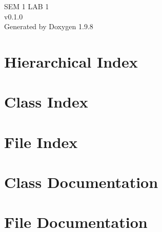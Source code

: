 \documentclass[twoside]{book}
\newcommand{\+}{\discretionary{\mbox{\scriptsize$\hookleftarrow$}}{}{}}
\newcommand{\clearemptydoublepage}{%
    \newpage{\pagestyle{empty}\cleardoublepage}%
  }
\begin{document}
  \raggedbottom
    \hypersetup{pageanchor=false,
                bookmarksnumbered=true,
                pdfencoding=unicode
               }
  \begin{titlepage}
  \vspace*{7cm}
  \begin{center}%
  {\Large SEM 1 LAB 1}\\
  [1ex]\large v0.\+1.\+0 \\
  \vspace*{1cm}
  {\large Generated by Doxygen 1.9.8}\\
  \end{center}
  \end{titlepage}
  \clearemptydoublepage
  \tableofcontents
  \clearemptydoublepage
  \hypersetup{pageanchor=true}


\chapter{Hierarchical Index}

\chapter{Class Index}

\chapter{File Index}

\chapter{Class Documentation}
















\chapter{File Documentation}

















  \backmatter
  \newpage
  \clearemptydoublepage
  \printindex
\end{document}
